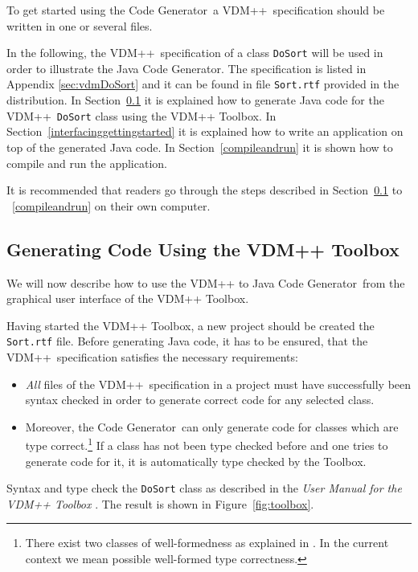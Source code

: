 \documentclass[\pformat,11pt]{article}
\newcommand{\ToolboxName}{VDM++ Toolbox}
\newcommand{\Toolbox}{Toolbox}
\newcommand{\tcg}{the Code Generator}
\newcommand{\langmancite}{\cite{LangManPP-CSK}}
\newcommand{\VDM}{VDM++}
\newcommand{\cg}{VDM++ to Java Code Generator}
\begin{document}
To get started using \tcg\ a \VDM\ specification should be written in
one or several files. 

In the following, the \VDM\ specification of a class {\tt DoSort} will
be used in order to illustrate the Java Code Generator.  The
specification is listed in Appendix \ref{sec:vdmDoSort} and it can be
found in file {\tt Sort.rtf} provided in the distribution. 
In Section~\ref{gui} it is explained how to generate Java code for the
\VDM\ {\tt DoSort} class using the \ToolboxName{}. In
Section~\ref{interfacinggettingstarted} it is explained how to
write an application on top of the generated Java code. In
Section~\ref{compileandrun} it is shown how to compile and run
the application. 

It is recommended that readers go through the steps described in
Section~\ref{gui} to ~\ref{compileandrun} on their own computer.

\subsection{Generating Code Using the VDM++ Toolbox}
\label{gui}

We will now describe how to use the \cg\ from the graphical user
interface of the \ToolboxName{}. 

Having started the \ToolboxName{}, a new project should be created the
{\tt Sort.rtf} file. Before generating Java code, it has to be
ensured, that the \VDM\  specification satisfies the necessary
requirements: 

\begin{itemize}
\item
{\em All} files of the \VDM\ specification in a project must have
successfully been syntax checked in order to generate correct code
for any selected class.  

\item
Moreover, \tcg\ can only generate code for classes which are type
correct.\footnote{There exist two classes of well-formedness as
  explained in \langmancite. In the current context we mean possible
  well-formed type correctness.} If a class has not been type checked
before and one tries to generate code for it, it is automatically type
checked by the \Toolbox{}.  
\end{itemize}

Syntax and type check the {\tt DoSort} class as described in the {\em
  User Manual for the \VDM{} Toolbox} \cite{UserManPP-CSK}. The
  result is shown in Figure~\ref{fig:toolbox}. 
\end{document}
